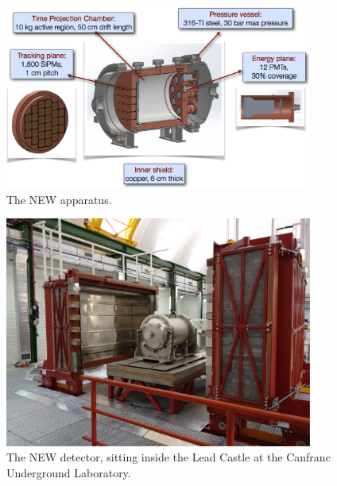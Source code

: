

\begin{figure}
\centering
\includegraphics[width=0.9\textwidth]{img2/NEW.png}
\caption{\small The NEW apparatus.} \label{fig:NEW}
\end{figure} 

\begin{figure}
\centering
\includegraphics[width=0.9\textwidth]{img2/NewCastle.png}
\caption{\small The NEW detector, sitting inside the Lead Castle at the Canfranc Underground Laboratory.} \label{fig.NewCastle}
\end{figure} 


